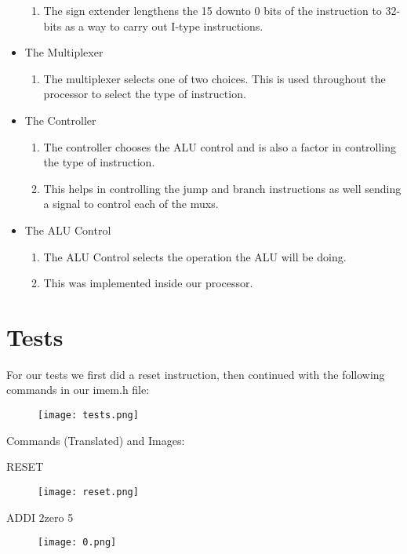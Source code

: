\documentclass[paper=letter, fontsize=11pt]{scrartcl} %
\numberwithin{equation}{section}
\numberwithin{figure}{section}
\numberwithin{table}{section}
\begin{document}
\begin{itemize}
	\begin{enumerate}
		\item The sign extender lengthens the 15 downto 0 bits of the instruction to 32-bits as a way to carry out I-type instructions.
	\end{enumerate}
	\item The Multiplexer
	\begin{enumerate}
		\item The multiplexer selects one of two choices. This is used throughout the processor to select the type of instruction.
	\end{enumerate}
	\item The Controller
	\begin{enumerate}
		\item The controller chooses the ALU control and is also a factor in controlling the type of instruction.
		\item This helps in controlling the jump and branch instructions as well sending a signal to control each of the muxs.
	\end{enumerate}
	\item The ALU Control
		\begin{enumerate}
		\item The ALU Control selects the operation the ALU will be doing.
		\item This was implemented inside our processor.
	\end{enumerate}
\end{itemize}

\pagebreak


\section{Tests}

\begin{center}
For our tests we first did a reset instruction, then continued with the following commands in our imem.h file:
\end{center}
\begin{figure}[H]
	\centering
		\texttt{[image: tests.png]}
	\label{fig:tests}
\end{figure}

\begin{center}
Commands (Translated) and Images:
\end{center}
RESET
\begin{figure}[H]
	\centering
		\texttt{[image: reset.png]}
	\label{fig:reset}
\end{figure}
\pagebreak
ADDI $2 $zero 5
\begin{figure}[H]
	\centering
		\texttt{[image: 0.png]}
	\label{fig:0}
\end{figure}
\end{document}
